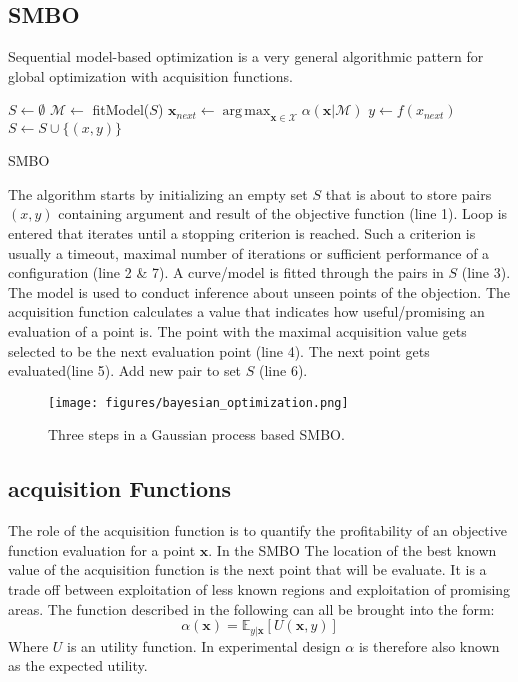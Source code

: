\documentclass[english]{article}
\newcommand{\x}{\mathbf{x}}
\newcommand{\E}{\mathbb{E}}
\newcommand{\M}{\mathcal{M}}
\newcommand{\X}{\mathcal{X}}
\DeclareMathOperator*{\argmax}{arg\,max}
\begin{document}
\subsection{SMBO}
Sequential model-based optimization is a very general algorithmic pattern for global optimization with acquisition functions.

\begin{algorithm}[H]
\SetAlgoLined

$S \leftarrow \emptyset$\;
{
  $\mathcal{M} \leftarrow$ fitModel($S$)\;
  $\x_{next} \leftarrow \argmax_{\x \in \X} \alpha(\x|\M)$\;
  $y \leftarrow f(x_{next})$\;
  $S \leftarrow S \cup \{(x,y)\}$\;
}
\caption{SMBO}
\end{algorithm}

The algorithm starts by initializing an empty set $S$ that is about to store pairs $(x,y)$ containing argument and result of the objective function (line 1). Loop is entered that iterates until a stopping criterion is reached. Such a criterion is usually a timeout, maximal number of iterations or sufficient performance of a configuration (line 2 \& 7). A curve/model is fitted through the pairs in $S$ (line 3). The model is used to conduct inference about unseen points of the objection. The acquisition function calculates a value that indicates how useful/promising an evaluation of a point is. The point with the maximal acquisition value gets selected to be the next evaluation point (line 4). The next point gets evaluated(line 5). Add new pair to set $S$ (line 6).

\begin{figure}
  \texttt{[image: figures/bayesian\_optimization.png]}
  \caption{Three steps in a Gaussian process based SMBO.}
  \label{bayesian optimization}
\end{figure}

\subsection{acquisition Functions}
\label{aquifuncs}
The role of the acquisition function is to quantify the profitability of an objective function evaluation for a point $\x$. In the SMBO The location of the best known value of the acquisition function is the next point that will be evaluate. It is a trade off between exploitation of less known regions and exploitation of promising areas. The function described in the following can all be brought into the form:
\begin{equation}
  \alpha(\x) = \E_{y|\x}[U(\x,y)]
\end{equation}
Where $U$ is an utility function. In experimental design $\alpha$ is therefore also known as the expected utility.
\end{document}
